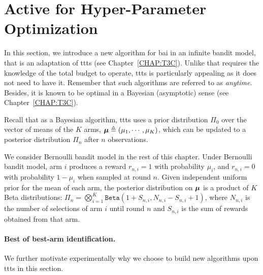 \section{Active \TTTS{} for Hyper-Parameter Optimization}\label{sec:dttts.algorithm}

In this section, we introduce a new algorithm for \gls{bai} in an infinite bandit model, that is an adaptation of \gls{ttts}{} (see Chapter~\ref{CHAP:T3C}). Unlike \SHA{} that requires the knowledge of the total budget to operate, \gls{ttts}{} is particularly appealing as it does not need to have it. Remember that such algorithms are referred to as \emph{anytime}. Besides, it is known to be optimal in a Bayesian (asymptotic) sense (see Chapter~\ref{CHAP:T3C}).

Recall that as a Bayesian algorithm, \gls{ttts} uses a prior distribution $\Pi_0$ over the vector of means of the $K$ arms, ${\boldsymbol \mu} \triangleq (\mu_1,\cdots,\mu_K)$, which can be updated to a posterior distribution $\Pi_n$ after $n$ observations. 

We consider Bernoulli bandit model in the rest of this chapter. Under Bernoulli bandit model, arm $i$ produces a reward $r_{n,i}=1$ with probability $\mu_i$, and $r_{n,i}=0$ with probability $1-\mu_i$ when sampled at round $n$. Given independent uniform prior for the mean of each arm, the posterior distribution on ${\boldsymbol \mu}$ is a product of $K$ Beta distributions: $\Pi_n = \bigotimes_{i=1}^{K} \texttt{Beta}(1+S_{n,i},N_{n,i}-S_{n,i}+1)$, where $N_{n,i}$ is the number of selections of arm $i$ until round $n$ and $S_{n,i}$ is the sum of rewards obtained from that arm. 

\paragraph{Best of best-arm identification.}

We further motivate experimentally why we choose to build new algorithms upon \gls{ttts} in this section. 

